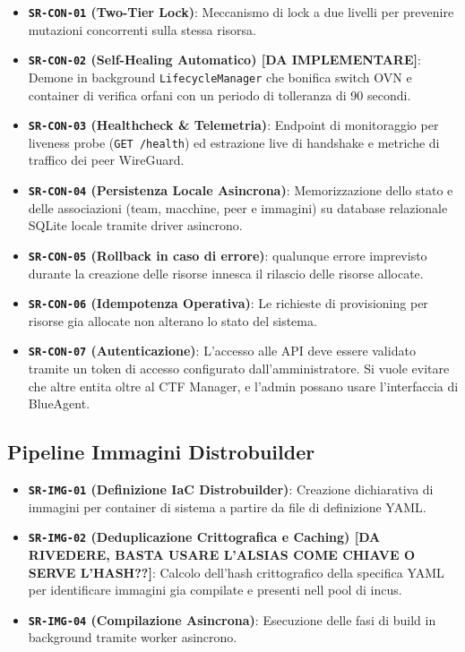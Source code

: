 \begin{itemize}
\tightlist
\item
  \textbf{\passthrough{\lstinline!SR-CON-01!} (Two-Tier Lock)}:
  Meccanismo di lock a due livelli per prevenire mutazioni concorrenti
  sulla stessa risorsa.
\item
  \textbf{\passthrough{\lstinline!SR-CON-02!} (Self-Healing Automatico)
  {[}DA IMPLEMENTARE{]}}: Demone in background
  \passthrough{\lstinline!LifecycleManager!} che bonifica switch OVN e
  container di verifica orfani con un periodo di tolleranza di 90
  secondi.
\item
  \textbf{\passthrough{\lstinline!SR-CON-03!} (Healthcheck \&
  Telemetria)}: Endpoint di monitoraggio per liveness probe
  (\passthrough{\lstinline!GET /health!}) ed estrazione live di
  handshake e metriche di traffico dei peer WireGuard.
\item
  \textbf{\passthrough{\lstinline!SR-CON-04!} (Persistenza Locale
  Asincrona)}: Memorizzazione dello stato e delle associazioni (team,
  macchine, peer e immagini) su database relazionale SQLite locale
  tramite driver asincrono.
\item
  \textbf{\passthrough{\lstinline!SR-CON-05!} (Rollback in caso di
  errore)}: qualunque errore imprevisto durante la creazione delle
  risorse innesca il rilascio delle risorse allocate.
\item
  \textbf{\passthrough{\lstinline!SR-CON-06!} (Idempotenza Operativa)}:
  Le richieste di provisioning per risorse gia allocate non alterano lo
  stato del sistema.
\item
  \textbf{\passthrough{\lstinline!SR-CON-07!} (Autenticazione)}:
  L'accesso alle API deve essere validato tramite un token di accesso
  configurato dall'amministratore. Si vuole evitare che altre entita
  oltre al CTF Manager, e l'admin possano usare l'interfaccia di
  BlueAgent.
\end{itemize}

\subsection{Pipeline Immagini
Distrobuilder}\label{pipeline-immagini-distrobuilder}

\begin{itemize}
\tightlist
\item
  \textbf{\passthrough{\lstinline!SR-IMG-01!} (Definizione IaC
  Distrobuilder)}: Creazione dichiarativa di immagini per container di
  sistema a partire da file di definizione YAML.
\item
  \textbf{\passthrough{\lstinline!SR-IMG-02!} (Deduplicazione
  Crittografica e Caching) {[}DA RIVEDERE, BASTA USARE L'ALSIAS COME
  CHIAVE O SERVE L'HASH??{]}}: Calcolo dell'hash crittografico della
  specifica YAML per identificare immagini gia compilate e presenti nell
  pool di incus.
\item
  \textbf{\passthrough{\lstinline!SR-IMG-04!} (Compilazione Asincrona)}:
  Esecuzione delle fasi di build in background tramite worker asincrono.
\end{itemize}
